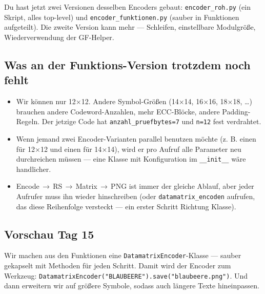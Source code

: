 Du hast jetzt zwei Versionen desselben Encoders gebaut:
\texttt{encoder\_roh.py} (ein Skript, alles top-level) und
\texttt{encoder\_funktionen.py} (sauber in Funktionen aufgeteilt).
Die zweite Version kann mehr — Schleifen, einstellbare Modulgröße,
Wiederverwendung der GF-Helper.

\subsection*{Was an der Funktions-Version trotzdem noch fehlt}

\begin{itemize}
\item Wir können nur 12$\times$12. Andere Symbol-Größen
  (14$\times$14, 16$\times$16, 18$\times$18, \dots) brauchen
  andere Codeword-Anzahlen, mehr ECC-Blöcke, andere
  Padding-Regeln. Der jetzige Code hat \texttt{anzahl\_pruefbytes=7}
  und \texttt{n=12} fest verdrahtet.
\item Wenn jemand zwei Encoder-Varianten parallel benutzen
  möchte (z. B. einen für 12$\times$12 und einen für
  14$\times$14), wird er pro Aufruf alle Parameter neu durchreichen
  müssen — eine Klasse mit Konfiguration im \texttt{\_\_init\_\_}
  wäre handlicher.
\item Encode\,$\to$\,RS\,$\to$\,Matrix\,$\to$\,PNG ist immer der
  gleiche Ablauf, aber jeder Aufrufer muss ihn wieder
  hinschreiben (oder \texttt{datamatrix\_encoden} aufrufen, das
  diese Reihenfolge versteckt — ein erster Schritt Richtung
  Klasse).
\end{itemize}

\subsection*{Vorschau Tag 15}

Wir machen aus den Funktionen eine \texttt{DatamatrixEncoder}-Klasse
— sauber gekapselt mit Methoden für jeden Schritt. Damit wird der
Encoder zum Werkzeug:
\texttt{DatamatrixEncoder("BLAUBEERE").save("blaubeere.png")}.
Und dann erweitern wir auf größere Symbole, sodass auch längere
Texte hineinpassen.
